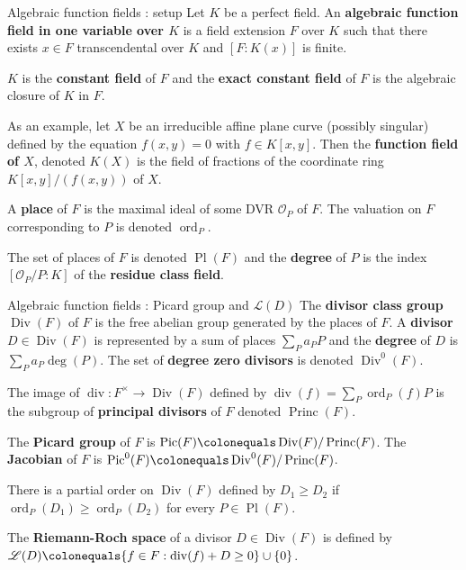 \documentclass[xcolor=dvipsnames]{beamer}
\theoremstyle{plain}
\DeclareMathOperator{\Div}{Div}
\DeclareMathOperator{\Princ}{Princ}
\DeclareMathOperator{\Pic}{Pic}
\DeclareMathOperator{\ddiv}{div}
\DeclareMathOperator{\ord}{ord}
\DeclareMathOperator{\Pl}{Pl}
\begin{document}
  \begin{frame}{Algebraic function fields : setup}
    Let $K$ be a perfect field.
    An \textbf{algebraic function field in one variable over $K$}
    is a field extension $F$ over $K$ such that there exists
    $x\in F$ transcendental over $K$ and
    $[F:K(x)]$ is finite.
    \par
    $K$ is the \textbf{constant field} of $F$
    and the \textbf{exact constant field} of $F$
    is the algebraic closure of $K$ in $F$.
    \par
    As an example,
    let $X$ be an irreducible affine plane curve
    (possibly singular)
    defined by the equation $f(x,y)=0$
    with $f\in K[x,y]$.
    Then the
    \textbf{function field of $X$},
    denoted $K(X)$ is the field of fractions
    of the coordinate ring $K[x,y]/(f(x,y))$
    of $X$.
    \par
    A \textbf{place} of $F$ is the maximal ideal
    of some DVR
    $\mathcal{O}_P$ of $F$.
    The valuation on $F$ corresponding to $P$ is
    denoted $\ord_P$.
    \par
    The set of places of $F$ is denoted
    $\Pl(F)$ and the \textbf{degree}
    of $P$ is the index
    $[\mathcal{O}_P/P:K]$ of the
    \textbf{residue class field}.
  \end{frame}
  \begin{frame}{Algebraic function fields : Picard group and $\mathscr{L}(D)$}
    The \textbf{divisor class group}
    $\Div(F)$ of $F$ is the free abelian group
    generated by the places of $F$.
    A \textbf{divisor} $D\in\Div(F)$ is represented by
    a sum of places $\sum_{P}a_PP$
    and the \textbf{degree}
    of $D$ is $\sum_{P}a_P\deg(P)$.
    \newline
    The set of \textbf{degree zero divisors} is denoted
    $\Div^0(F)$.
    \par
    The image of $\ddiv\colon F^\times\to\Div(F)$ defined by
    $
      \ddiv(f) = \sum_{P}\ord_P(f)P
    $
    is the subgroup of
    \textbf{principal divisors} of $F$
    denoted $\Princ(F)$.
    \par
    The \textbf{Picard group} of $F$ is
    $\Pic(F)\colonequals\Div(F)/\Princ(F)$.
    \newline
    The \textbf{Jacobian} of $F$ is
    $\Pic^0(F)\colonequals\Div^0(F)/\Princ(F)$.
    \par
    There is a partial order on $\Div(F)$
    defined by $D_1\geq D_2$ if
    $\ord_P(D_1)\geq\ord_P(D_2)$ for
    every $P\in\Pl(F)$.
    \par
    The \textbf{Riemann-Roch space} of a divisor
    $D\in\Div(F)$ is defined by
    $\mathscr{L}(D)\colonequals\{f\in F : \ddiv(f)+D\geq 0\}\cup\{0\}$.
  \end{frame}
\end{document}
